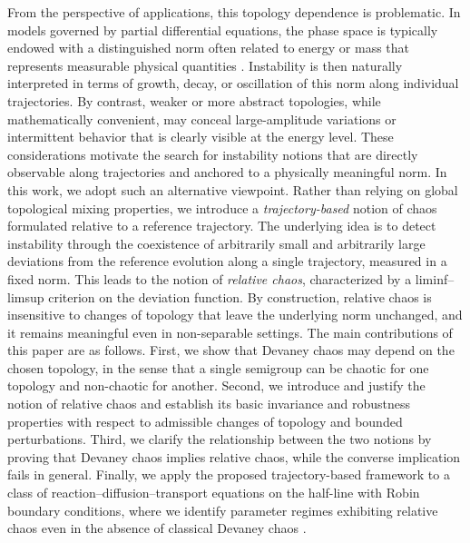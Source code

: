 \documentclass[12pt]{article}
\begin{document}
From the perspective of applications, this topology dependence is problematic. In models governed by partial differential equations, the phase space is typically endowed with a distinguished norm often related to energy or mass that represents measurable physical quantities \cite{RenardyRogers2004}. Instability is then naturally interpreted in terms of growth, decay, or oscillation of this norm along individual trajectories. By contrast, weaker or more abstract topologies, while mathematically convenient, may conceal large-amplitude variations or intermittent behavior that is clearly visible at the energy level. These considerations motivate the search for instability notions that are directly observable along trajectories and anchored to a physically meaningful norm. In this work, we adopt such an alternative viewpoint. Rather than relying on global topological mixing properties, we introduce a \emph{trajectory-based} notion of chaos formulated relative to a reference trajectory. The underlying idea is to detect instability through the coexistence of arbitrarily small and arbitrarily large deviations from the reference evolution along a single trajectory, measured in a fixed norm. This leads to the notion of \emph{relative chaos}, characterized by a liminf--limsup criterion on the deviation function. By construction, relative chaos is insensitive to changes of topology that leave the underlying norm unchanged, and it remains meaningful even in non-separable settings. The main contributions of this paper are as follows. First, we show that Devaney chaos may depend on the chosen topology, in the sense that a single semigroup can be chaotic for one topology and non-chaotic for another. Second, we introduce and justify the notion of relative chaos and establish its basic invariance and robustness properties with respect to admissible changes of topology and bounded perturbations. Third, we clarify the relationship between the two notions by proving that Devaney chaos implies relative chaos, while the converse implication fails in general. Finally, we apply the proposed trajectory-based framework to a class of reaction--diffusion--transport equations on the half-line with Robin boundary conditions, where we identify parameter regimes exhibiting relative chaos even in the absence of classical Devaney chaos \cite{ZhuYang2025}.
\end{document}
